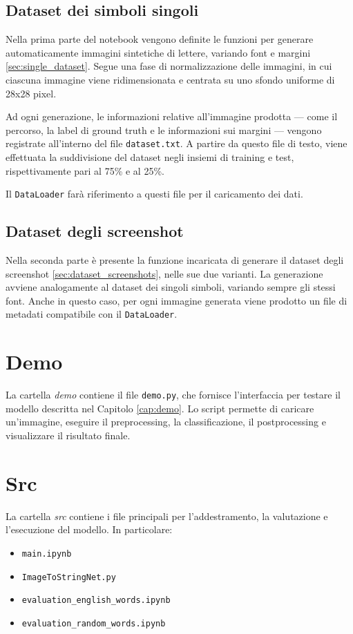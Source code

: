 \subsection*{Dataset dei simboli singoli}
Nella prima parte del notebook vengono definite le funzioni per generare automaticamente immagini sintetiche di lettere, variando font e margini \ref{sec:single_dataset}.  
Segue una fase di normalizzazione delle immagini, in cui ciascuna immagine viene ridimensionata e centrata su uno sfondo uniforme di 28x28 pixel.

Ad ogni generazione, le informazioni relative all'immagine prodotta — come il percorso, la label di ground truth e le informazioni sui margini — vengono registrate all'interno del file \texttt{dataset.txt}.
A partire da questo file di testo, viene effettuata la suddivisione del dataset negli insiemi di training e test, rispettivamente pari al 75\% e al 25\%.

Il \texttt{DataLoader} farà riferimento a questi file per il caricamento dei dati.

\subsection*{Dataset degli screenshot}
Nella seconda parte è presente la funzione incaricata di generare il dataset degli screenshot \ref{sec:dataset_screenshots}, nelle sue due varianti. La generazione avviene analogamente al dataset dei singoli simboli, variando sempre gli stessi font.
Anche in questo caso, per ogni immagine generata viene prodotto un file di metadati compatibile con il \texttt{DataLoader}.

\section{Demo}
La cartella \emph{demo} contiene il file \texttt{demo.py}, che fornisce l'interfaccia per testare il modello descritta nel Capitolo \ref{cap:demo}. Lo script permette di caricare un'immagine, eseguire il preprocessing, la classificazione, il postprocessing e visualizzare il risultato finale.

\section{Src}
La cartella \emph{src} contiene i file principali per l'addestramento, la valutazione e l'esecuzione del modello. In particolare:
\begin{itemize}
    \item \texttt{main.ipynb}
    \item \texttt{ImageToStringNet.py}
    \item \texttt{evaluation\_english\_words.ipynb}
    \item \texttt{evaluation\_random\_words.ipynb}
\end{itemize}


